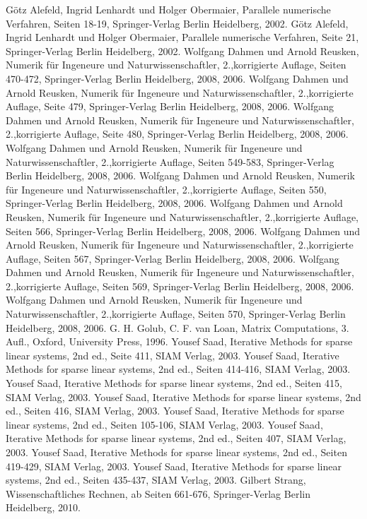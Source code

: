 \begin{thebibliography}{56}

Götz Alefeld, Ingrid Lenhardt und Holger Obermaier,
Parallele numerische Verfahren,
Seiten 18-19,
Springer-Verlag Berlin Heidelberg,
2002.
Götz Alefeld, Ingrid Lenhardt und Holger Obermaier,
Parallele numerische Verfahren,
Seite 21,
Springer-Verlag Berlin Heidelberg,
2002.
Wolfgang Dahmen und Arnold Reusken,
Numerik für Ingeneure und Naturwissenschaftler,
2.,korrigierte Auflage,
Seiten 470-472,
Springer-Verlag Berlin Heidelberg,
2008, 2006.
Wolfgang Dahmen und Arnold Reusken,
Numerik für Ingeneure und Naturwissenschaftler,
2.,korrigierte Auflage,
Seite 479,
Springer-Verlag Berlin Heidelberg,
2008, 2006.
Wolfgang Dahmen und Arnold Reusken,
Numerik für Ingeneure und Naturwissenschaftler,
2.,korrigierte Auflage,
Seite 480,
Springer-Verlag Berlin Heidelberg,
2008, 2006.
Wolfgang Dahmen und Arnold Reusken,
Numerik für Ingeneure und Naturwissenschaftler,
2.,korrigierte Auflage,
Seiten 549-583,
Springer-Verlag Berlin Heidelberg,
2008, 2006.
Wolfgang Dahmen und Arnold Reusken,
Numerik für Ingeneure und Naturwissenschaftler,
2.,korrigierte Auflage,
Seiten 550,
Springer-Verlag Berlin Heidelberg,
2008, 2006.
Wolfgang Dahmen und Arnold Reusken,
Numerik für Ingeneure und Naturwissenschaftler,
2.,korrigierte Auflage,
Seiten 566,
Springer-Verlag Berlin Heidelberg,
2008, 2006.
Wolfgang Dahmen und Arnold Reusken,
Numerik für Ingeneure und Naturwissenschaftler,
2.,korrigierte Auflage,
Seiten 567,
Springer-Verlag Berlin Heidelberg,
2008, 2006.
Wolfgang Dahmen und Arnold Reusken,
Numerik für Ingeneure und Naturwissenschaftler,
2.,korrigierte Auflage,
Seiten 569,
Springer-Verlag Berlin Heidelberg,
2008, 2006.
Wolfgang Dahmen und Arnold Reusken,
Numerik für Ingeneure und Naturwissenschaftler,
2.,korrigierte Auflage,
Seiten 570,
Springer-Verlag Berlin Heidelberg,
2008, 2006.
G. H. Golub, C. F. van Loan,
Matrix Computations,
3. Aufl.,
Oxford,
University Press,
1996.
Yousef Saad,
Iterative Methods for sparse linear systems,
2nd ed.,
Seite 411,
SIAM Verlag,
2003.
Yousef Saad,
Iterative Methods for sparse linear systems,
2nd ed.,
Seiten 414-416,
SIAM Verlag,
2003.
Yousef Saad,
Iterative Methods for sparse linear systems,
2nd ed.,
Seiten 415,
SIAM Verlag,
2003.
Yousef Saad,
Iterative Methods for sparse linear systems,
2nd ed.,
Seiten 416,
SIAM Verlag,
2003.
Yousef Saad,
Iterative Methods for sparse linear systems,
2nd ed.,
Seiten 105-106,
SIAM Verlag,
2003.
Yousef Saad,
Iterative Methods for sparse linear systems,
2nd ed.,
Seiten 407,
SIAM Verlag,
2003.
Yousef Saad,
Iterative Methods for sparse linear systems,
2nd ed.,
Seiten 419-429,
SIAM Verlag,
2003.
Yousef Saad,
Iterative Methods for sparse linear systems,
2nd ed.,
Seiten 435-437,
SIAM Verlag,
2003.
Gilbert Strang,
Wissenschaftliches Rechnen,
ab Seiten 661-676,
Springer-Verlag Berlin Heidelberg,
2010.

\end{thebibliography}

